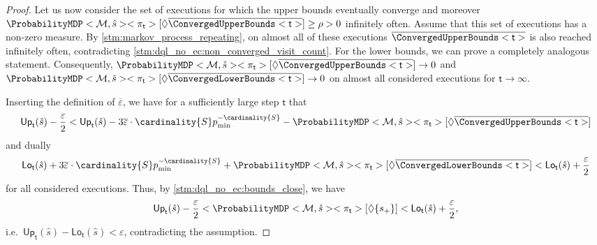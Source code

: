 \documentclass{theoretics}
\newcommand{\setcomplement}[1]{\overline{#1}}
\newcommand{\MDP}{\mathcal{M}}
\newcommand{\States}{S}
\newcommand{\initialstate}{\hat{s}}
\newcommand{\strategy}{\pi}
\newcommand{\reach}{\Diamond}
\newcommand{\upperbound}{\mathsf{Up}}
\newcommand{\lowerbound}{\mathsf{Lo}}
\newcommand{\targetstate}{s_+}
\newcommand{\updatestep}{{\overline{\varepsilon}}}
\newcommand{\algostep}{\mathsf{t}}
\begin{document}
\begin{proof}
	Let us now consider the set of executions for which the upper bounds eventually converge and moreover $\ProbabilityMDP<\MDP, \initialstate><\strategy_\algostep>[\reach \setcomplement{\ConvergedUpperBounds<\algostep>}] \geq \rho > 0$ infinitely often.
	Assume that this set of executions has a non-zero measure.
	By \cref{stm:markov_process_repeating}, on almost all of these executions $\setcomplement{\ConvergedUpperBounds<\algostep>}$ is also reached infinitely often, contradicting \cref{stm:dql_no_ec:non_converged_visit_count}.
	For the lower bounds, we can prove a completely analogous statement.
	Consequently, $\ProbabilityMDP<\MDP, \initialstate><\strategy_{\algostep}>[\reach \setcomplement{\ConvergedUpperBounds<\algostep>}] \to 0$ and $\ProbabilityMDP<\MDP, \initialstate><\strategy_{\algostep}>[\reach \setcomplement{\ConvergedLowerBounds<\algostep>}] \to 0$ on almost all considered executions for $\algostep \to \infty$.

	Inserting the definition of $\updatestep$, we have for a sufficiently large step $\algostep$ that
	\begin{equation*}
		\upperbound_\algostep(\initialstate) - \frac{\varepsilon}{2} < \upperbound_\algostep(\initialstate) - 3 \updatestep \cdot \cardinality{\States} p_{\min}^{-\cardinality{\States}} - \ProbabilityMDP<\MDP, \initialstate><\strategy_\algostep>[\reach \overline{\ConvergedUpperBounds<\algostep>}]
	\end{equation*}
	and dually
	\begin{equation*}
		\lowerbound_\algostep(\initialstate) + 3 \updatestep \cdot \cardinality{\States} p_{\min}^{-\cardinality{\States}} + \ProbabilityMDP<\MDP, \initialstate><\strategy_\algostep>[\reach \overline{\ConvergedLowerBounds<\algostep>}] < \lowerbound_\algostep(\initialstate) + \frac{\varepsilon}{2}
	\end{equation*}
	for all considered executions.
	Thus, by \cref{stm:dql_no_ec:bounds_close}, we have
	\begin{equation*}
		\upperbound_\algostep(\initialstate) - \frac{\varepsilon}{2} < \ProbabilityMDP<\MDP, \initialstate><\strategy_\algostep>[\reach \{\targetstate\}] < \lowerbound_\algostep(\initialstate) + \frac{\varepsilon}{2},
	\end{equation*}
	i.e.\ $\upperbound_\algostep(\initialstate) - \lowerbound_\algostep(\initialstate) < \varepsilon$, contradicting the assumption.


\end{proof}
\end{document}
